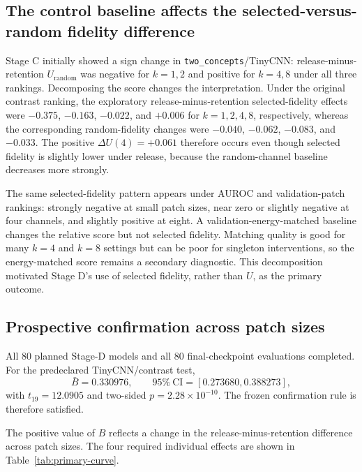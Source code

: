 \documentclass[10pt]{article}
\begin{document}
\subsection{The control baseline affects the selected-versus-random fidelity difference}\label{sec:decomposition}

Stage C initially showed a sign change in \texttt{two\_concepts}/TinyCNN: release-minus-retention $U_{\mathrm{random}}$ was negative for $k=1,2$ and positive for $k=4,8$ under all three rankings. Decomposing the score changes the interpretation. Under the original contrast ranking, the exploratory release-minus-retention selected-fidelity effects were $-0.375$, $-0.163$, $-0.022$, and $+0.006$ for $k=1,2,4,8$, respectively, whereas the corresponding random-fidelity changes were $-0.040$, $-0.062$, $-0.083$, and $-0.033$. The positive $\Delta U(4)=+0.061$ therefore occurs even though selected fidelity is slightly lower under release, because the random-channel baseline decreases more strongly.

The same selected-fidelity pattern appears under AUROC and validation-patch rankings: strongly negative at small patch sizes, near zero or slightly negative at four channels, and slightly positive at eight. A validation-energy-matched baseline changes the relative score but not selected fidelity. Matching quality is good for many $k=4$ and $k=8$ settings but can be poor for singleton interventions, so the energy-matched score remains a secondary diagnostic. This decomposition motivated Stage D's use of selected fidelity, rather than $U$, as the primary outcome.

\subsection{Prospective confirmation across patch sizes}\label{sec:confirmation}

All 80 planned Stage-D models and all 80 final-checkpoint evaluations completed. For the predeclared TinyCNN/contrast test,
\[
\bar B=0.330976,\qquad
95\%\ \mathrm{CI}=[0.273680,0.388273],
\]
with $t_{19}=12.0905$ and two-sided $p=2.28\times10^{-10}$. The frozen confirmation rule is therefore satisfied.

The positive value of $B$ reflects a change in the release-minus-retention difference across patch sizes. The four required individual effects are shown in Table~\ref{tab:primary-curve}.
\end{document}
